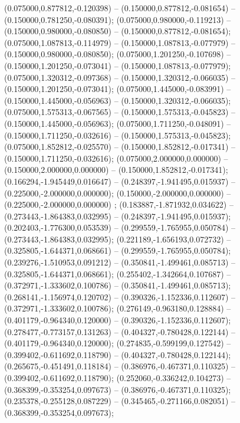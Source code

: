  (0.075000,0.877812,-0.120398) -- (0.150000,0.877812,-0.081654) -- (0.150000,0.781250,-0.080391);
 (0.075000,0.980000,-0.119213) -- (0.150000,0.980000,-0.080850) -- (0.150000,0.877812,-0.081654);
 (0.075000,1.087813,-0.114979) -- (0.150000,1.087813,-0.077979) -- (0.150000,0.980000,-0.080850);
 (0.075000,1.201250,-0.107698) -- (0.150000,1.201250,-0.073041) -- (0.150000,1.087813,-0.077979);
 (0.075000,1.320312,-0.097368) -- (0.150000,1.320312,-0.066035) -- (0.150000,1.201250,-0.073041);
 (0.075000,1.445000,-0.083991) -- (0.150000,1.445000,-0.056963) -- (0.150000,1.320312,-0.066035);
 (0.075000,1.575313,-0.067565) -- (0.150000,1.575313,-0.045823) -- (0.150000,1.445000,-0.056963);
 (0.075000,1.711250,-0.048091) -- (0.150000,1.711250,-0.032616) -- (0.150000,1.575313,-0.045823);
 (0.075000,1.852812,-0.025570) -- (0.150000,1.852812,-0.017341) -- (0.150000,1.711250,-0.032616);
 (0.075000,2.000000,0.000000) -- (0.150000,2.000000,0.000000) -- (0.150000,1.852812,-0.017341);
 (0.166294,-1.945449,0.016647) -- (0.248397,-1.941495,0.015937) -- (0.225000,-2.000000,0.000000);
 (0.150000,-2.000000,0.000000) -- (0.225000,-2.000000,0.000000) ;
 (0.183887,-1.871932,0.034622) -- (0.273443,-1.864383,0.032995) -- (0.248397,-1.941495,0.015937);
 (0.202403,-1.776300,0.053539) -- (0.299559,-1.765955,0.050784) -- (0.273443,-1.864383,0.032995);
 (0.221189,-1.656193,0.072732) -- (0.325805,-1.644371,0.068661) -- (0.299559,-1.765955,0.050784);
 (0.239276,-1.510953,0.091212) -- (0.350841,-1.499461,0.085713) -- (0.325805,-1.644371,0.068661);
 (0.255402,-1.342664,0.107687) -- (0.372971,-1.333602,0.100786) -- (0.350841,-1.499461,0.085713);
 (0.268141,-1.156974,0.120702) -- (0.390326,-1.152336,0.112607) -- (0.372971,-1.333602,0.100786);
 (0.276149,-0.963180,0.128884) -- (0.401179,-0.964340,0.120000) -- (0.390326,-1.152336,0.112607);
 (0.278477,-0.773157,0.131263) -- (0.404327,-0.780428,0.122144) -- (0.401179,-0.964340,0.120000);
 (0.274835,-0.599199,0.127542) -- (0.399402,-0.611692,0.118790) -- (0.404327,-0.780428,0.122144);
 (0.265675,-0.451491,0.118184) -- (0.386976,-0.467371,0.110325) -- (0.399402,-0.611692,0.118790);
 (0.252060,-0.336242,0.104273) -- (0.368399,-0.353254,0.097673) -- (0.386976,-0.467371,0.110325);
 (0.235378,-0.255128,0.087229) -- (0.345465,-0.271166,0.082051) -- (0.368399,-0.353254,0.097673);
